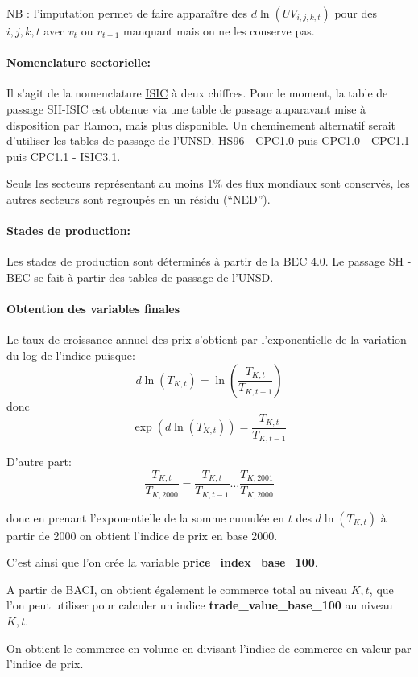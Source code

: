 \documentclass[12pt]{article}
\begin{document}
NB : l'imputation permet de faire apparaître des $d\ln(UV_{i,j,k,t})$ pour des $i,j,k,t$ avec $v_t$ ou $v_{t-1}$ manquant mais on ne les conserve pas.

\paragraph{Nomenclature sectorielle:} 

Il s'agit de la nomenclature \href{https://unstats.un.org/unsd/classifications/Econ}{ISIC} à deux chiffres. Pour le moment, la table de passage SH-ISIC est obtenue via une table de passage auparavant mise à disposition par Ramon, mais plus disponible. Un cheminement alternatif serait d'utiliser les tables de passage de l'UNSD. HS96 - CPC1.0 puis CPC1.0 - CPC1.1 puis CPC1.1 - ISIC3.1.

Seuls les secteurs représentant au moins 1\% des flux mondiaux sont conservés, les autres secteurs sont regroupés en un résidu (``NED'').

\paragraph{Stades de production:}

Les stades de production sont déterminés à partir de la BEC 4.0. Le passage SH - BEC se fait à partir des tables de passage de l'UNSD. 

\paragraph{Obtention des variables finales}

Le taux de croissance annuel des prix s'obtient par l'exponentielle de la variation du log de l'indice puisque:
$$ d\ln(T_{K,t}) = \ln \left( \frac{T_{K,t}}{T_{K,t-1}} \right) $$
donc 
$$ \exp(d\ln(T_{K,t})) = \frac{T_{K,t}}{T_{K,t-1}}$$
  
D'autre part:
$$\frac{T_{K,t}}{T_{K,2000}} = \frac{T_{K,t}}{T_{K,t-1}} \dots \frac{T_{K,2001}}{T_{K,2000}}$$

donc en prenant l'exponentielle de la somme cumulée en $t$ des $d\ln(T_{K,t})$ à partir de 2000 on obtient l'indice de prix en base 2000. 

C'est ainsi que l'on crée la variable \textbf{price\_index\_base\_100}. 

A partir de BACI, on obtient également le commerce total au niveau $K, t$, que l'on peut utiliser pour calculer un indice \textbf{trade\_value\_base\_100} au niveau $K, t$. 

On obtient le commerce en volume en divisant l'indice de commerce en valeur par l'indice de prix. 
\end{document}
